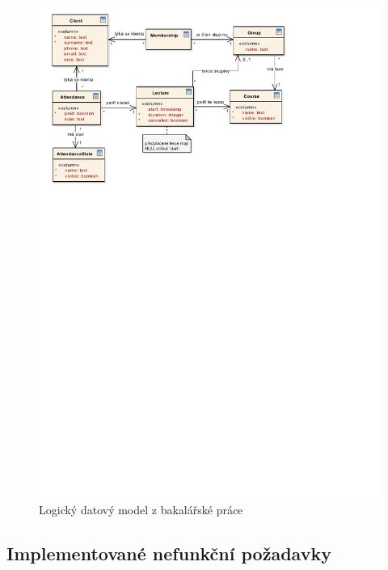 \begin{figure}[h]\centering
	\includegraphics[width=1\textwidth]{img/bp/db-model}
	\caption[Logický datový model z bakalářské práce]{Logický datový model z bakalářské práce \cite{bp}}\label{fig:db-model-bp}
\end{figure}

\subsection{Implementované nefunkční požadavky}

